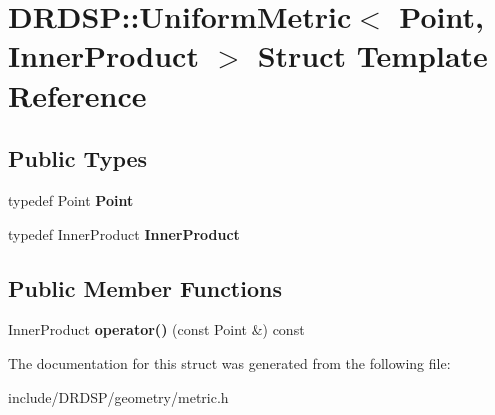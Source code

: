 \hypertarget{struct_d_r_d_s_p_1_1_uniform_metric}{\section{D\-R\-D\-S\-P\-:\-:Uniform\-Metric$<$ Point, Inner\-Product $>$ Struct Template Reference}
\label{struct_d_r_d_s_p_1_1_uniform_metric}
}
\subsection*{Public Types}
\begin{DoxyCompactItemize}
\item 
\hypertarget{struct_d_r_d_s_p_1_1_uniform_metric_ac3dcdc4791e2c355540524ac3eb88b58}{typedef Point {\bfseries Point}}\label{struct_d_r_d_s_p_1_1_uniform_metric_ac3dcdc4791e2c355540524ac3eb88b58}

\item 
\hypertarget{struct_d_r_d_s_p_1_1_uniform_metric_a4f7e6f085e48e4496bb8747368e4e4aa}{typedef Inner\-Product {\bfseries Inner\-Product}}\label{struct_d_r_d_s_p_1_1_uniform_metric_a4f7e6f085e48e4496bb8747368e4e4aa}

\end{DoxyCompactItemize}
\subsection*{Public Member Functions}
\begin{DoxyCompactItemize}
\item 
\hypertarget{struct_d_r_d_s_p_1_1_uniform_metric_a731c6750b68fd705e740b620a72a8f9f}{Inner\-Product {\bfseries operator()} (const Point \&) const }\label{struct_d_r_d_s_p_1_1_uniform_metric_a731c6750b68fd705e740b620a72a8f9f}

\end{DoxyCompactItemize}


The documentation for this struct was generated from the following file\-:\begin{DoxyCompactItemize}
\item 
include/\-D\-R\-D\-S\-P/geometry/metric.\-h\end{DoxyCompactItemize}
